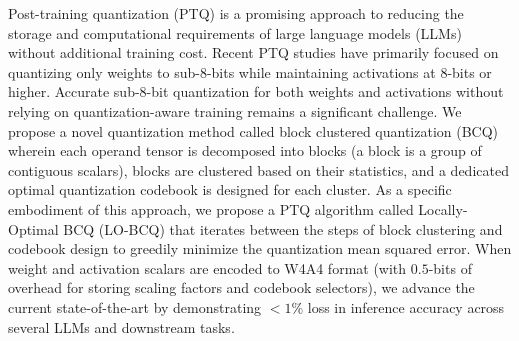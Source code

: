 Post-training quantization (PTQ) is a promising approach to reducing the storage and computational requirements of large language models (LLMs) without additional training cost. Recent PTQ studies have primarily focused on quantizing only weights to sub-$8$-bits while maintaining activations at $8$-bits or higher. Accurate sub-8-bit quantization for both weights and activations without relying on quantization-aware training remains a significant challenge. We propose a novel quantization method called block clustered quantization (BCQ) wherein each operand tensor is decomposed into blocks (a block is a group of contiguous scalars), blocks are clustered based on their statistics, and a dedicated optimal quantization codebook is designed for each cluster. As a specific embodiment of this approach, we propose a PTQ algorithm called Locally-Optimal BCQ (LO-BCQ) that iterates between the steps of block clustering and codebook design to greedily minimize the quantization mean squared error. When weight and activation scalars are encoded to W4A4 format (with $0.5$-bits of overhead for storing scaling factors and codebook selectors), we advance the current state-of-the-art by demonstrating $<1$\% loss in inference accuracy across several LLMs and downstream tasks.